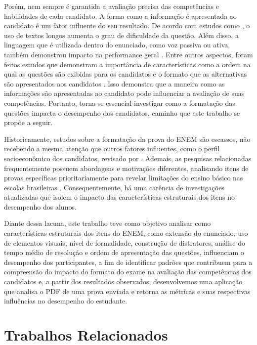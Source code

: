 \documentclass[a4paper,10pt, twocolumn]{article}
\begin{document}
Porém, nem sempre é garantida a avaliação precisa das competências e habilidades de cada candidato. A forma como a informação é apresentada ao candidato é um fator influente do seu resultado. De acordo com estudos como \textcite{Pullishery2020,2018,silva2019desempenho}, o uso de textos longos aumenta o grau de dificuldade da questão. Além disso, a linguagem que é utilizada dentro do enunciado, como voz passiva ou ativa, também demonstrou impacto na performance geral \cite{correia2004complexidade,Marcom2016}. Entre outros aspectos, foram feitos estudos que demonstram a importância de características como a ordem na qual as questões são exibidas para os candidatos \cite{Barichello2022,Anaya2023} e o formato que as alternativas são apresentados aos candidatos \cite{Marcom2016,lopes2015estudo,Caldwell2013}. Isso demonstra que a maneira como as informações são apresentadas ao candidato pode influenciar a avaliação de suas competências. Portanto, torna-se essencial investigar como a formatação das questões impacta o desempenho dos candidatos, caminho que este trabalho se propõe a seguir.

Historicamente, estudos sobre a formatação da prova do ENEM são escassos, não recebendo a mesma atenção que outros fatores influentes, como o perfil socioeconômico dos candidatos, revisado por \textcite{Dutra2023}. Ademais, as pesquisas relacionadas frequentemente possuem abordagens e motivações diferentes, analisando itens de provas específicas prioritariamente para revelar limitações do ensino básico nas escolas brasileiras \cite{Cestaro2020, lopes2015estudo}. Consequentemente, há uma carência de investigações atualizadas que isolem o impacto das características estruturais dos itens no desempenho dos alunos.

Diante dessa lacuna, este trabalho teve como objetivo analisar como características estruturais dos itens do ENEM, como extensão do enunciado, uso de elementos visuais, nível de formalidade, construção de distratores, análise do tempo médio de resolução e ordem de apresentação das questões, influenciam o desempenho dos participantes, a fim de identificar padrões que contribuem para a compreensão do impacto do formato do exame na avaliação das competências dos candidatos e, a partir dos resultados observados, desenvolvemos uma aplicação que analisa o PDF de uma prova enviada e retorna as métricas e suas respectivas influências no desempenho do estudante.
\section{Trabalhos Relacionados}
\end{document}

